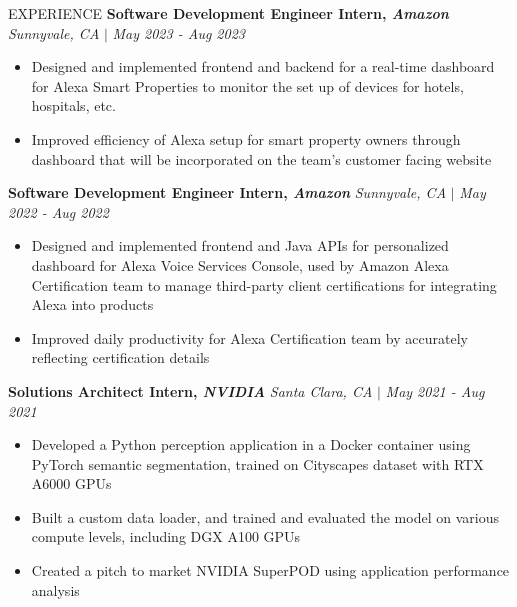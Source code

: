 \documentclass{resume} %
\begin{document}
\begin{rSection}{EXPERIENCE}
\textbf{Software Development Engineer Intern, \textit{Amazon}} \hfill {\it Sunnyvale, CA} \(|\)
{\it May 2023 - Aug 2023}
\begin{itemize}
    \itemsep -0.5em \vspace{-0.5em}
    \item Designed and implemented frontend and backend for a real-time dashboard for Alexa Smart Properties to monitor the set up of devices for hotels, hospitals, etc. 
    \item Improved efficiency of Alexa setup for smart property owners through dashboard that will be incorporated on the team's customer facing website
\end{itemize}

\textbf{Software Development Engineer Intern, \textit{Amazon}} \hfill {\it Sunnyvale, CA} \(|\) {\it May 2022 - Aug 2022}
\begin{itemize}
    \itemsep -0.5em \vspace{-0.5em}
    \item Designed and implemented frontend and Java APIs for personalized dashboard for Alexa Voice Services Console, used by Amazon Alexa Certification team to manage third-party client certifications for integrating Alexa into products
    \item Improved daily productivity for Alexa Certification team by accurately reflecting certification details
\end{itemize}

\textbf{Solutions Architect Intern, \textit{NVIDIA}} \hfill {\it Santa Clara, CA} \(|\) {\it May 2021 - Aug 2021}
\begin{itemize}
    \itemsep -0.5em \vspace{-0.5em}
    \item Developed a Python perception application in a Docker container using PyTorch semantic segmentation, trained on Cityscapes dataset with RTX A6000 GPUs
    \item Built a custom data loader, and trained and evaluated the model on various compute levels, including DGX A100 GPUs
    \item Created a pitch to market NVIDIA SuperPOD using application performance analysis
\end{itemize}

\end{rSection}
\end{document}
